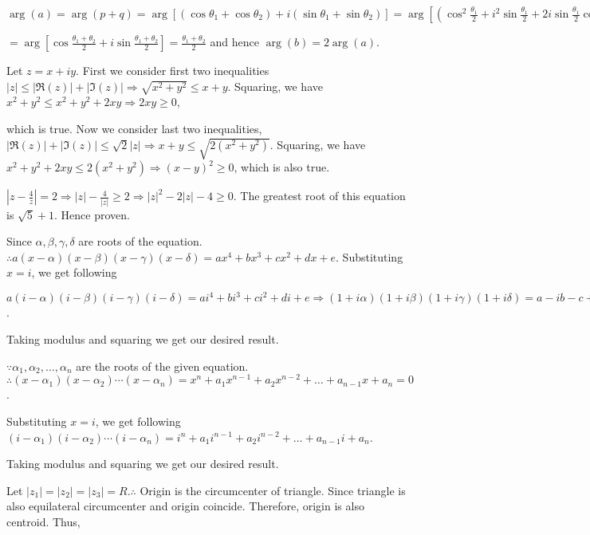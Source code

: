   $\arg(a) = \arg(p + q) = \arg[(\cos\theta_1 + \cos\theta_2) + i(\sin\theta_1 + \sin\theta_2)] =
  \arg\left[\left(\cos^2\frac{\theta_1}{2} + i^2\sin\frac{\theta_1}{2} +
    2i\sin\frac{\theta_1}{2}\cos\frac{\theta_1}{2}\right) + \left(\cos^2\frac{\theta_2}{2} +
    i^2\sin\frac{\theta_2}{2} +2i\sin\frac{\theta_2}{2}\cos\frac{\theta_2}{2}\right)\right]$

  $=\arg\left[\cos\frac{\theta_1 + \theta_2}{2} + i\sin\frac{\theta_1 + \theta_2}{2}\right] = \frac{\theta_1
    + \theta_2}{2}$ and hence $\arg(b) = 2\arg(a)$.
\item Let $z = x + iy$. First we consider first two inequalities $|z| \le |\Re(z)| + |\Im(z)| \Rightarrow
  \sqrt{x^2 + y^2} \le x + y$. Squaring, we have $x^2 + y^2 \le x^2 + y^2 + 2xy \Rightarrow 2xy \ge 0$,

  which is true. Now we consider last two inequalities, $|\Re(z)| + |\Im(z)| \le \sqrt{2}|z|\Rightarrow x + y
  \le \sqrt{2(x^2 + y^2)}$. Squaring, we have $x^2 + y^2 + 2xy \le 2(x^2 + y^2) \Rightarrow (x - y)^2 \ge 0$,
  which is also true.
\item $\left|z - \frac{4}{z}\right| = 2 \Rightarrow |z| - \frac{4}{|z|} \geq 2 \Rightarrow |z|^2 - 2|z| -
  4\geq 0$. The greatest root of this equation is $\sqrt{5} + 1$. Hence proven.
\item Since $\alpha, \beta, \gamma, \delta$ are roots of the equation. $\therefore a(x - \alpha)(x - \beta)(x
  - \gamma)(x - \delta) = ax^4 + bx^3 + cx^2 + dx + e$. Substituting $x = i$, we get following

  $a(i - \alpha)(i - \beta)(i - \gamma)(i - \delta) = ai^4 + bi^3 + ci^2 + di + e \Rightarrow (1 + i\alpha)(1
  + i\beta)(1 + i\gamma)(1 + i\delta) = a - ib - c + id + e$.

  Taking modulus and squaring we get our desired result.
\item $\because \alpha_1, \alpha_2, \ldots, \alpha_n$ are the roots of the given equation. $\therefore (x -
  \alpha_1)(x - \alpha_2)\cdots(x - \alpha_n) = x^n + a_1x^{n - 1} + a_2x^{n - 2} + \ldots + a_{n- 1}x +
  a_n= 0$.

  Substituting $x = i$, we get following $(i - \alpha_1)(i - \alpha_2)\cdots(i - \alpha_n) = i^n + a_1i^{n -
    1} + a_2i^{n - 2} + \ldots + a_{n- 1}i +a_n$.

  Taking modulus and squaring we get our desired result.
\item Let $|z_1| = |z_2| = |z_3| = R. \therefore$ Origin is the circumcenter of triangle. Since triangle is
  also equilateral circumcenter and origin coincide. Therefore, origin is also centroid. Thus,

